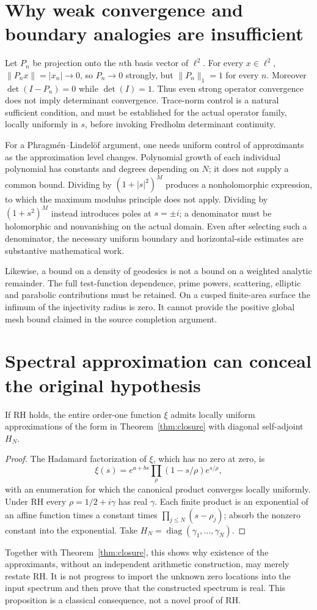 \section{Why weak convergence and boundary analogies are insufficient}
Let $P_n$ be projection onto the $n$th basis vector of $\ell^2$.
For every $x\in\ell^2$, $\|P_nx\|=|x_n|\to0$, so $P_n\to0$ strongly,
but $\|P_n\|_1=1$ for every $n$. Moreover
$\det(I-P_n)=0$ while $\det(I)=1$.
Thus even strong operator convergence does not imply determinant
convergence. Trace-norm control is a natural sufficient condition, and
must be established for the actual operator family, locally uniformly
in $s$, before invoking Fredholm determinant continuity.

For a Phragm\'en--Lindel\"of argument, one needs uniform control of
approximants as the approximation level changes. Polynomial growth of
each individual polynomial has constants and degrees depending on $N$;
it does not supply a common bound. Dividing by $(1+|s|^2)^M$ produces a
nonholomorphic expression, to which the maximum modulus principle does
not apply. Dividing by $(1+s^2)^M$ instead introduces poles at $s=\pm i$;
a denominator must be holomorphic and nonvanishing on the actual domain.
Even after selecting such a denominator, the necessary uniform boundary
and horizontal-side estimates are substantive mathematical work.

Likewise, a bound on a density of geodesics is not a bound on a weighted
analytic remainder. The full test-function dependence, prime powers,
scattering, elliptic and parabolic contributions must be retained.
On a cusped finite-area surface the infimum of the injectivity radius
is zero. It cannot provide the positive global mesh bound claimed in the
source completion argument.

\section{Spectral approximation can conceal the original hypothesis}
\begin{proposition}
If RH holds, the entire order-one function $\xi$ admits locally uniform
approximations of the form in Theorem~\ref{thm:closure} with diagonal
self-adjoint $H_N$.
\end{proposition}
\begin{proof}
The Hadamard factorization of $\xi$, which has no zero at zero, is
\[
 \xi(s)=e^{a+bs}\prod_\rho(1-s/\rho)e^{s/\rho},
\]
with an enumeration for which the canonical product converges locally
uniformly. Under RH every $\rho=1/2+i\gamma$ has real $\gamma$.
Each finite product is an exponential of an affine function times a
constant times $\prod_{j\le N}(s-\rho_j)$; absorb the nonzero constant
into the exponential. Take $H_N=\operatorname{diag}(\gamma_1,\ldots,\gamma_N)$.
\end{proof}
Together with Theorem~\ref{thm:closure}, this shows why existence of the
approximants, without an independent arithmetic construction, may merely
restate RH. It is not progress to import the unknown zero locations into
the input spectrum and then prove that the constructed spectrum is real.
This proposition is a classical consequence, not a novel proof of RH.

